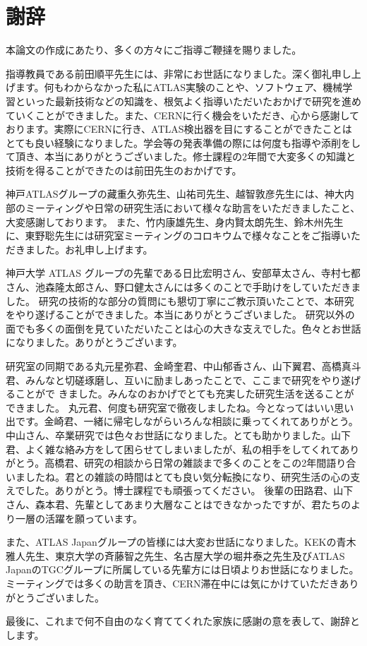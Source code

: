 \chapter*{謝辞}

本論文の作成にあたり、多くの方々にご指導ご鞭撻を賜りました。

指導教員である前田順平先生には、非常にお世話になりました。深く御礼申し上げます。何もわからなかった私にATLAS実験のことや、ソフトウェア、機械学習といった最新技術などの知識を、根気よく指導いただいたおかげで研究を進めていくことができました。また、CERNに行く機会をいただき、心から感謝しております。実際にCERNに行き、ATLAS検出器を目にすることができたことはとても良い経験になりました。学会等の発表準備の際には何度も指導や添削をして頂き、本当にありがとうございました。修士課程の2年間で大変多くの知識と技術を得ることができたのは前田先生のおかげです。

神戸ATLASグループの藏重久弥先生、山\ajTatsuSaki 祐司先生、越智敦彦先生には、神大内部のミーティングや日常の研究生活において様々な助言をいただきましたこと、大変感謝しております。
また、竹内康雄先生、身内賢太朗先生、鈴木州先生に、東野聡先生には研究室ミーティングのコロキウムで様々なことをご指導いただきました。お礼申し上げます。

神戸大学 ATLAS グループの先輩である日比宏明さん、安部草太さん、寺村七都さん、池森隆太郎さん、野口健太さんには多くのことで手助けをしていただきました。
研究の技術的な部分の質問にも懇切丁寧にご教示頂いたことで、本研究をやり遂げることができました。本当にありがとうございました。
研究以外の面でも多くの面倒を見ていただいたことは心の大きな支えでした。色々とお世話になりました。ありがとうございます。

研究室の同期である丸元星弥君、金崎奎君、中山郁香さん、山下翼君、高橋真斗君、みんなと切磋琢磨し、互いに励ましあったことで、ここまで研究をやり遂げることがで
きました。みんなのおかげでとても充実した研究生活を送ることができました。
丸元君、何度も研究室で徹夜しましたね。今となってはいい思い出です。金崎君、一緒に帰宅しながらいろんな相談に乗ってくれてありがとう。中山さん、卒業研究では色々お世話になりました。とても助かりました。山下君、よく雑な絡み方をして困らせてしまいましたが、私の相手をしてくれてありがとう。高橋君、研究の相談から日常の雑談まで多くのことをこの2年間語り合いましたね。君との雑談の時間はとても良い気分転換になり、研究生活の心の支えでした。ありがとう。博士課程でも頑張ってください。
後輩の田路君、山下さん、森本君、先輩としてあまり大層なことはできなかったですが、君たちのより一層の活躍を願っています。


また、ATLAS Japanグループの皆様には大変お世話になりました。KEKの青木雅人先生、東京大学の斉藤智之先生、名古屋大学の堀井泰之先生及びATLAS JapanのTGCグループに所属している先輩方には日頃よりお世話になりました。ミーティングでは多くの助言を頂き、CERN滞在中には気にかけていただきありがとうございました。

最後に、これまで何不自由のなく育ててくれた家族に感謝の意を表して、謝辞とします。






